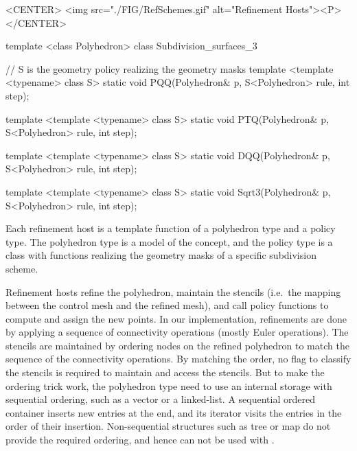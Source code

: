 \begin{ccHtmlOnly}
  <CENTER>
     <img src="./FIG/RefSchemes.gif" alt="Refinement Hosts"><P>
  </CENTER>
\end{ccHtmlOnly}


\begin{ccExampleCode}
template <class Polyhedron>
class Subdivision_surfaces_3 {
  // S is the geometry policy realizing the geometry masks
  template <template <typename> class S>
  static void PQQ(Polyhedron& p, S<Polyhedron> rule, int step);

  template <template <typename> class S>
  static void PTQ(Polyhedron& p, S<Polyhedron> rule, int step);

  template <template <typename> class S>
  static void DQQ(Polyhedron& p, S<Polyhedron> rule, int step);

  template <template <typename> class S>
  static void Sqrt3(Polyhedron& p, S<Polyhedron> rule, int step);
}
\end{ccExampleCode}


Each refinement host is a template function of
a polyhedron type and a policy type. The polyhedron type is
a model of the  concept, and the
policy type is a class with functions realizing the 
geometry masks of a specific subdivision scheme.

Refinement hosts refine the polyhedron, maintain the stencils 
(i.e.~the mapping between the control mesh and the refined mesh), 
and call policy functions to compute and assign the new points. 
In our implementation, refinements are done by applying a 
sequence of connectivity operations (mostly Euler operations).
The stencils are maintained by ordering nodes on the refined 
polyhedron to match the sequence of the connectivity operations. 
By matching the order, no flag to classify the stencils 
is required to maintain and access the stencils.
But to make the ordering trick work, the polyhedron type need 
to use an internal storage with sequential ordering, such as
a vector or a linked-list. A sequential ordered container inserts
new entries at the end, and its iterator visits the entries in the 
order of their insertion. Non-sequential structures such as 
tree or map do not provide the required ordering, and hence
can not be used with .
 
